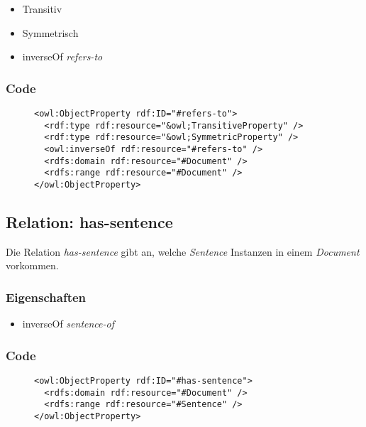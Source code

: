\documentclass[
    11pt,
    latin1,
    a4paper,
    oneside
]{scrreprt}
\begin{document}
\begin{itemize}
  \item Transitiv
  \item Symmetrisch
  \item inverseOf \emph{refers-to}
\end{itemize}

\subsubsection{Code} \label{sec:rel_refersto_code}

\begin{figure}[h]
 \lstset{language=XML}
 \begin{lstlisting}[label=owl:refersto,caption={Die Relation \emph{refers-to} beschreibt die Abh\"angigkeiten unter Dokumenten}]
<owl:ObjectProperty rdf:ID="#refers-to">
  <rdf:type rdf:resource="&owl;TransitiveProperty" />
  <rdf:type rdf:resource="&owl;SymmetricProperty" />
  <owl:inverseOf rdf:resource="#refers-to" />
  <rdfs:domain rdf:resource="#Document" />
  <rdfs:range rdf:resource="#Document" />
</owl:ObjectProperty>
 \end{lstlisting}
\end{figure}


\subsection{Relation: has-sentence} \label{sec:rel_hassentence}

Die Relation \emph{has-sentence} gibt an, welche \emph{Sentence} Instanzen in einem \emph{Document} vorkommen.

\subsubsection{Eigenschaften} \label{sec:rel_hassentence_settings}

\begin{itemize}
  \item inverseOf \emph{sentence-of}
\end{itemize}

\subsubsection{Code} \label{sec:rel_hassentence_code}

\begin{figure}[h]
 \lstset{language=XML}
 \begin{lstlisting}[label=owl:hassentence,caption={Die Relation \emph{has-sentence} gibt an, welches Dokuemnt aus welchen S\"atzen besteht}]
<owl:ObjectProperty rdf:ID="#has-sentence">
  <rdfs:domain rdf:resource="#Document" />
  <rdfs:range rdf:resource="#Sentence" />
</owl:ObjectProperty>
 \end{lstlisting}
\end{figure}
\end{document}
